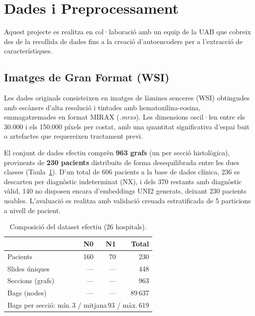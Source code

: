 \documentclass[10pt,a4paper,twocolumn,twoside]{article}
\begin{document}
\section{Dades i Preprocessament}

Aquest projecte es realitza en col·laboració amb un equip de la UAB que cobreix des de la recollida de dades fins
a la creació d'autoencoders per a l'extracció de característiques.

\subsection{Imatges de Gran Format (WSI)}

Les dades originals consisteixen en imatges de làmines senceres (WSI) obtingudes amb escàners d'alta resolució i
tintades amb hematoxilina-eosina, emmagatzemades en format MIRAX (\textit{.mrxs}). Les dimensions oscil·len entre
els 30.000 i els 150.000 píxels per costat, amb una quantitat significativa d'espai buit o artefactes que
requereixen tractament previ.

El conjunt de dades efectiu comprèn \textbf{963 grafs} (un per secció histològica), provinents de
\textbf{230 pacients} distribuits de forma desequilibrada entre les dues classes
(Taula~\ref{tab:dataset}). D'un total de 606 pacients a la base de dades clínica, 236 es descarten
per diagnòstic indeterminat (NX), i dels 370 restants amb diagnòstic vàlid, 140 no disposen encara
d'embeddings UNI2 generats, deixant 230 pacients usables. L'avaluació es realitza amb validació
creuada estratificada de 5 particions a nivell de pacient.

\begin{table}[h]
\centering
\caption{Composició del dataset efectiu (26 hospitals).}
\label{tab:dataset}
\small
\begin{tabular}{lrrr}
\toprule
 & \textbf{N0} & \textbf{N1} & \textbf{Total} \\
\midrule
Pacients         & 160 & 70 & 230      \\
Slides úniques   & —   & —  & 448      \\
Seccions (grafs) & —   & —  & 963      \\
Bags (nodes)     & —   & —  & 89\,637  \\
\bottomrule
\multicolumn{4}{l}{\scriptsize Bags per secció: mín.\,3 / mitjana\,93 / màx.\,619} \\
\end{tabular}
\end{table}
\end{document}
